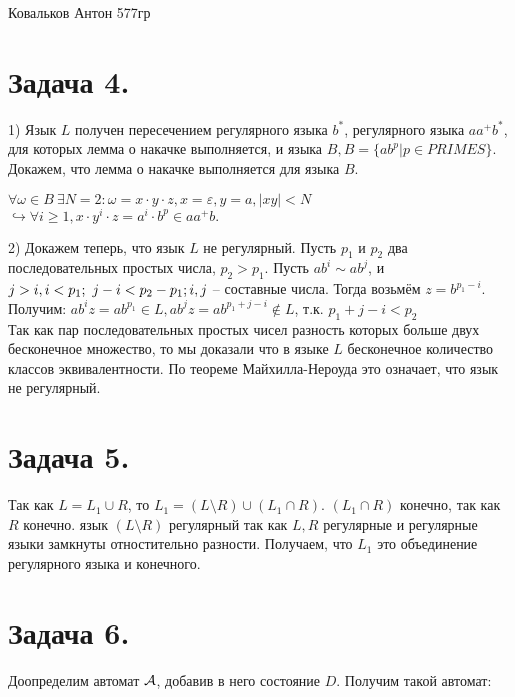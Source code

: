 \documentclass[12pt]{article}
\theoremstyle{definition}
\theoremstyle{definition}
\let\geq\geqslant
\let\eps\varepsilon
\let\o\omega
\def\A{{\cal A}}
\begin{document}
\begin{center} {\LARGE Ковальков Антон 577гр} \end{center}
\section*{Задача  4.}
1) Язык $L$ получен пересечением регулярного языка $b^*$, регулярного языка $aa^+b^*$, для которых лемма о накачке выполняется, и языка  $B, B = \{ab^p|p \in PRIMES\}$. Докажем, что лемма о накачке выполняется для языка $B$. 

$\forall \o \in B \ \exists N = 2: \o = x\cdot y\cdot z, x = \eps, y = a, |xy|<N$\\\hspace*{2.5cm}$\hookrightarrow \forall i \geq 1, x \cdot y^i \cdot z = a^i\cdot b^p \in aa^+b.$

2) Докажем теперь, что язык $L$ не регулярный. Пусть $p_1$ и $p_2$ два последовательных простых числа, $p_2 > p_1$. Пусть $ab^i \sim ab^j$, и $j > i,\\ i< p_1;\ j - i < p_2 - p_1; i, j$ -- составные числа. Тогда возьмём $z = b^{p_1 - i}$.\\
Получим: $ab^iz=ab^{p_1} \in L, ab^jz = ab^{p_1 + j-i} \notin L$, т.к. $p_1 + j - i < p_2$\\ Так как пар последовательных простых чисел разность которых больше двух бесконечное множество, то мы доказали что в языке $L$ бесконечное количество классов эквивалентности. По теореме Майхилла-Нероуда это означает, что язык не регулярный.


\section*{Задача  5.}
Так как $L = L_1 \cup R$, то $L_1 = (L \setminus R) \cup (L_1 \cap R)$. $(L_1 \cap R)$ конечно, так как $R$ конечно. язык $(L \setminus R)$ регулярный так как $L, R$ регулярные и регулярные языки замкнуты отностительно разности. Получаем, что  $L_1$ это объединение регулярного языка и конечного.

\section*{Задача  6.}

Доопределим автомат $\A$, добавив в него состояние $D$. Получим такой автомат:
\end{document}

